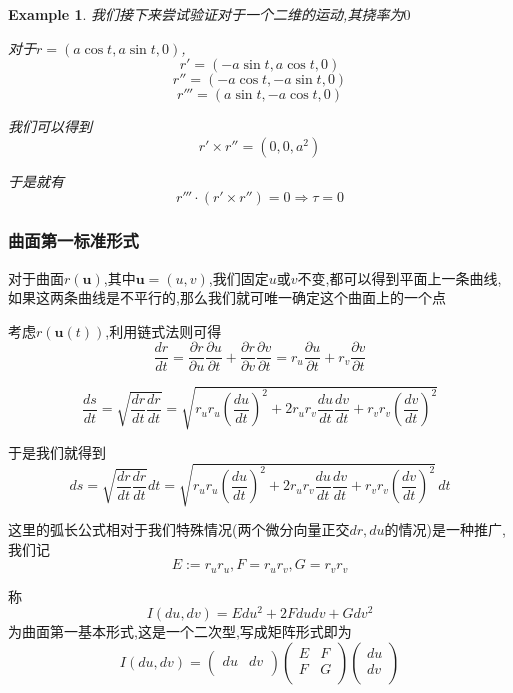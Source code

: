 \documentclass[11pt,hyperref,a4paper,UTF8]{ctexart}
\newtheorem{example}{Example}[subsection]
\newcommand{\parameter}[1]{\left(#1\right)}
\newcommand{\ve}{\boldsymbol}
\begin{document}
\begin{CJK}{UTF8}{gkai}
\begin{example}
  我们接下来尝试验证对于一个二维的运动,其挠率为$0$

  对于$r = (a\cos t,a\sin t,0)$,
  \[r' = (-a\sin t,a\cos t,0)\]
  \[r'' = (-a\cos t,-a\sin t,0)\]
  \[r''' = (a\sin t,-a\cos t,0)\]

  我们可以得到
  \[r' \times r'' = (0,0,a^2)\]

  于是就有
  \[r'''\cdot (r'\times r'') = 0 \Rightarrow \tau = 0\]
\end{example}

\subsubsection{曲面第一标准形式}

对于曲面$r(\ve{u})$,其中$\ve{u} = (u,v)$,我们固定$u$或$v$不变,都可以得到平面上一条曲线,如果这两条曲线是不平行的,那么我们就可唯一确定这个曲面上的一个点

考虑$r(\ve{u}(t))$,利用链式法则可得
\[\frac{dr}{dt} = \frac{\partial r}{\partial u}\frac{\partial u}{\partial t} +  \frac{\partial r}{\partial v}\frac{\partial v}{\partial t} = r_u \frac{\partial u}{\partial t} +  r_v \frac{\partial v}{\partial t}\]

\[\frac{ds}{dt} = \sqrt{\frac{dr}{dt} \frac{dr}{dt}} = \sqrt{r_u r_u \parameter{\frac{du}{dt}}^2 + 2r_u r_v \frac{du}{dt} \frac{dv}{dt} + r_v r_v \parameter{\frac{dv}{dt}}^2}\]

于是我们就得到
\[ds = \sqrt{\frac{dr}{dt} \frac{dr}{dt}}dt = \sqrt{r_u r_u \parameter{\frac{du}{dt}}^2 + 2r_u r_v \frac{du}{dt} \frac{dv}{dt} + r_v r_v \parameter{\frac{dv}{dt}}^2} \, dt\]

这里的弧长公式相对于我们特殊情况(两个微分向量正交$dr,du$的情况)是一种推广,我们记
\[E := r_u r_u ,F = r_u r_v , G = r_v r_v\]

称
\[I(du,dv) = E du^2 + 2 F du dv + G dv^2\]
为曲面第一基本形式,这是一个二次型,写成矩阵形式即为
\[I(du,dv) = \begin{pmatrix}
  du & dv\\
\end{pmatrix}
\begin{pmatrix}
  E & F\\
  F & G\\
\end{pmatrix}
\begin{pmatrix}
  du\\
  dv\\
\end{pmatrix}\]


\end{CJK}
\end{document}
